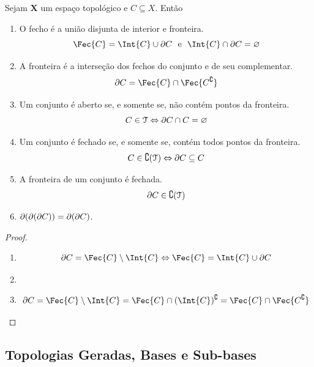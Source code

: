 \begin{prop}
	Sejam $\bm X$ um espaço topológico e $C \subseteq X$. Então
	\begin{enumerate}
	\item O fecho é a união disjunta de interior e fronteira.
	\begin{equation*}
	\Fec{C} = \Int{C} \cup \fro{C} \e \Int{C} \cap \fro{C} = \emptyset
	\end{equation*}
	\item A fronteira é a interseção dos fechos do conjunto e de seu complementar.
	\begin{equation*}
	\fro{C} = \Fec{C} \cap \Fec{C^\complement}
	\end{equation*}
	\item Um conjunto é aberto se, e somente se, não contém pontos da fronteira.
	\begin{equation*}
	C \in \mathcal{T} \Leftrightarrow \partial C \cap C = \varnothing
	\end{equation*}
	\item Um conjunto é fechado se, e somente se, contém todos pontos da fronteira.
	\begin{equation*}
	C \in \complement(\mathcal{T}) \Leftrightarrow \partial C \subseteq C
	\end{equation*}
	\item A fronteira de um conjunto é fechada.
	\begin{equation*}
	\partial C \in \complement(\mathcal{T})
	\end{equation*}
	\item $\partial (\partial (\partial C)) = \partial (\partial C)$.
	\end{enumerate}
\end{prop}
\begin{proof}
	\begin{enumerate}
	\item
	\begin{equation*}
	\fro{C} = \Fec{C} \setminus \Int{C} \Leftrightarrow \Fec{C} = \Int{C} \cup \fro{C}
	\end{equation*}
	\item
	\item 
	\begin{equation*}
	\fro{C} = \Fec{C} \setminus \Int{C} = \Fec{C} \cap (\Int{C})^\complement = \Fec{C} \cap \Fec{C^\complement}
	\end{equation*}
	\end{enumerate}
\end{proof}

\subsection{Topologias Geradas, Bases e Sub-bases}

